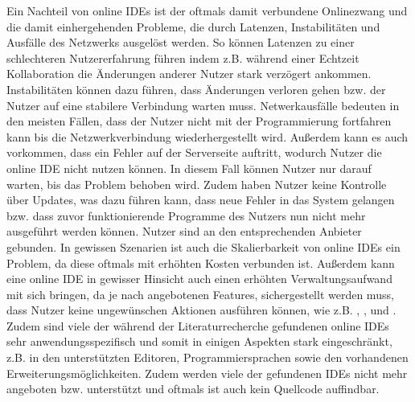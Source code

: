 Ein Nachteil von online IDEs ist der oftmals damit verbundene Onlinezwang und die damit einhergehenden Probleme, die durch Latenzen, Instabilitäten und Ausfälle des Netzwerks ausgelöst werden. So können Latenzen zu einer schlechteren Nutzererfahrung führen indem z.B. während einer Echtzeit Kollaboration die Änderungen anderer Nutzer stark verzögert ankommen. Instabilitäten können dazu führen, dass Änderungen verloren gehen bzw. der Nutzer auf eine stabilere Verbindung warten muss. Netwerkausfälle bedeuten in den meisten Fällen, dass der Nutzer nicht mit der Programmierung fortfahren kann bis die Netzwerkverbindung wiederhergestellt wird. Außerdem kann es auch vorkommen, dass ein Fehler auf der Serverseite auftritt, wodurch Nutzer die online IDE nicht nutzen können. In diesem Fall können Nutzer nur darauf warten, bis das Problem behoben wird. Zudem haben Nutzer keine Kontrolle über Updates, was dazu führen kann, dass neue Fehler in das System gelangen bzw. dass zuvor funktionierende Programme des Nutzers nun nicht mehr ausgeführt werden können. Nutzer sind an den entsprechenden Anbieter gebunden.  In gewissen Szenarien ist auch die Skalierbarkeit von online IDEs ein Problem, da diese oftmals mit erhöhten Kosten verbunden ist. Außerdem kann eine online IDE in gewisser Hinsicht auch einen erhöhten Verwaltungsaufwand mit sich bringen, da je nach angebotenen Features, sichergestellt werden muss, dass Nutzer keine ungewünschen Aktionen ausführen können, wie z.B. , ,  \cite{wu_ceclipse_2011} und  \cite{srinivasa_bad_2022}.  Zudem sind viele der während der Literaturrecherche gefundenen online IDEs sehr anwendungsspezifisch und somit in einigen Aspekten stark eingeschränkt, z.B. in den unterstützten Editoren, Programmiersprachen sowie den vorhandenen Erweiterungsmöglichkeiten.  Zudem werden viele der gefundenen IDEs nicht mehr angeboten bzw. unterstützt und oftmals ist auch kein Quellcode auffindbar.